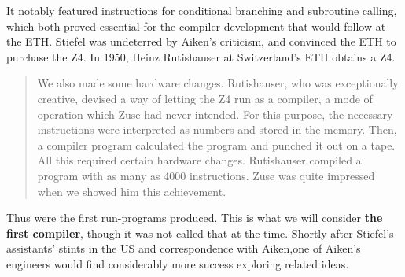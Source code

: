 It notably featured instructions for conditional branching and subroutine
calling, which both proved essential for the compiler development that would
follow at the ETH. Stiefel was undeterred by Aiken's criticism, and convinced
the ETH to purchase the Z4. In 1950, Heinz Rutishauser at Switzerland's ETH
obtains a Z4.

\begin{quotation}
	We also made some hardware changes. Rutishauser, who was exceptionally
	creative, devised a way of letting the Z4 run as a compiler, a mode
	of operation
	which Zuse had never intended. For this purpose, the necessary
	instructions were
	interpreted as numbers and stored in the memory. Then, a compiler
	program calculated the program and punched it out on a tape. All this required
	certain hardware changes. Rutishauser compiled a program with as many as 4000
	instructions. Zuse was quite impressed when we showed him this achievement.
	\cite{konrad-zuses-z4-2000}
\end{quotation}

Thus were the first run-programs produced. This is what we will
consider \textbf{the first compiler}, though it was not called that
at the time. Shortly after Stiefel's assistants' stints in the US and
correspondence with Aiken,one of Aiken's engineers would find
considerably more success exploring related ideas.
